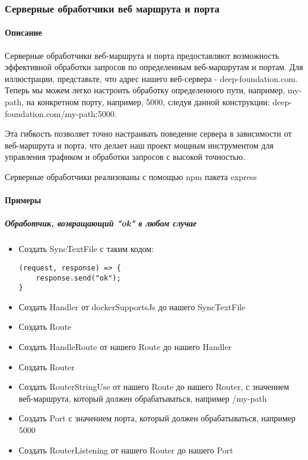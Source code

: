 \documentclass{article}
\begin{document}
\subsubsection{Серверные обработчики веб маршрута и порта}
\paragraph{Описание}
Серверные обработчики веб-маршрута и порта предоставляют возможность
эффективной обработки запросов по определенным веб-маршрутам и портам. Для
иллюстрации, представьте, что адрес нашего веб-сервера - deep-foundation.com.
Теперь мы можем легко настроить обработку определенного пути, например,
my-path, на конкретном порту, например, 5000, следуя данной конструкции:
deep-foundation.com/my-path:5000.

Эта гибкость позволяет точно настраивать поведение сервера в зависимости от
веб-маршрута и порта, что делает наш проект мощным инструментом для управления
трафиком и обработки запросов с высокой точностью.

Серверные обработчики реализованы с помощью npm пакета express
\paragraph{Примеры}
\subparagraph{Обработчик, возвращающий "ok" в любом случае}
\begin{itemize}
  \item Создать SyncTextFile с таким кодом:
        \begin{lstlisting}
(request, response) => {
    response.send("ok");
}
\end{lstlisting}
  \item Создать Handler от dockerSupportsJs до нашего SyncTextFile
  \item Создать Route
  \item Создать HandleRoute от нашего Route до нашего Handler
  \item Создать Router
  \item Создать RouterStringUse от нашего Route до нашего Router, с значением
        веб-маршрута, который должен обрабатываться, например /my-path
  \item Создать Port с значением порта, который должен обрабатываться, например
        5000
  \item Создать RouterListening от нашего Router до нашего Port
\end{itemize}
\end{document}
